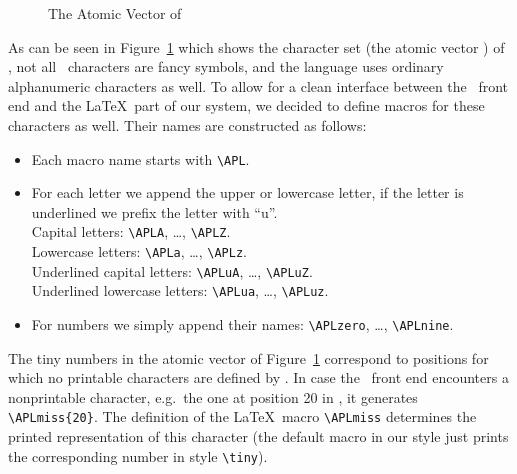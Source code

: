 \begin{figure}[hbpt]
\begin{minipage}{70mm}
\begin{APLarray}
\APLmb{\APLY}\APLmb{\APLZ}\APLmb{\APLslashbar}\APLmb{
\APLslopebar}\APLmb{\APLdieresisdot}\APLmb{\APLcirclebar}\APLmb{
\APLquaddivide}\APLmb{\APLuptackjot}
\APLspace\par
\APLmb{\APLzero}\APLmb{\APLone}\APLmb{\APLtwo}\APLmb{
\APLthree}\APLmb{\APLfour}\APLmb{\APLfive}\APLmb{\APLsix}\APLmb{
\APLseven}\APLmb{\APLeight}\APLmb{\APLnine}
\APLmb{\APLdeltilde}\APLmb{\protect\APLdeltaunderbar}\APLmb{
\APLcirclestar}\APLmb{\APLdowntackjot}
\APLspace\par
\end{APLarray}
\end{minipage}
\caption{The Atomic Vector of \label{atomic}}
\end{figure}
 
As can be seen in Figure~\ref{atomic} which shows the
character set (the atomic vector \APLquad\APLA\APLV)
of , not all \APL\ characters are fancy
symbols, and the language uses ordinary
alphanumeric characters as well.
To allow for a clean interface between the
\APL\ front end and the \LaTeX\ part of our
system, we decided to define macros for
these characters as well. Their names are
constructed as follows:
 
\begin{itemize}\dense\raggedright
\item Each macro name starts with \verb+\APL+.
\item For each letter we append the upper or lowercase
      letter, if the letter is underlined we prefix
      the letter with ``u''. \\
      Capital letters: \verb+\APLA+, \dots, \verb+\APLZ+.\\
      Lowercase letters: \verb+\APLa+, \dots, \verb+\APLz+.\\
      Underlined capital letters: \verb+\APLuA+, \dots, \verb+\APLuZ+.\\
      Underlined lowercase letters: \verb+\APLua+, \dots, \verb+\APLuz+.
\item For numbers we simply append their names: \verb+\APLzero+,
      \dots, \verb+\APLnine+.
\end{itemize}
 
The tiny numbers in the atomic vector of Figure~\ref{atomic}
correspond to positions for which no printable characters
are defined by . In case the \APL\ front end
encounters a nonprintable character, e.g.\ the one
at position 20 in \APLquad\APLA\APLV, it generates
\verb+\APLmiss{20}+. The definition of the \LaTeX\ macro
\verb+\APLmiss+ determines the printed representation of
this character (the default macro in our style
just prints the corresponding number in style \verb+\tiny+).
 
